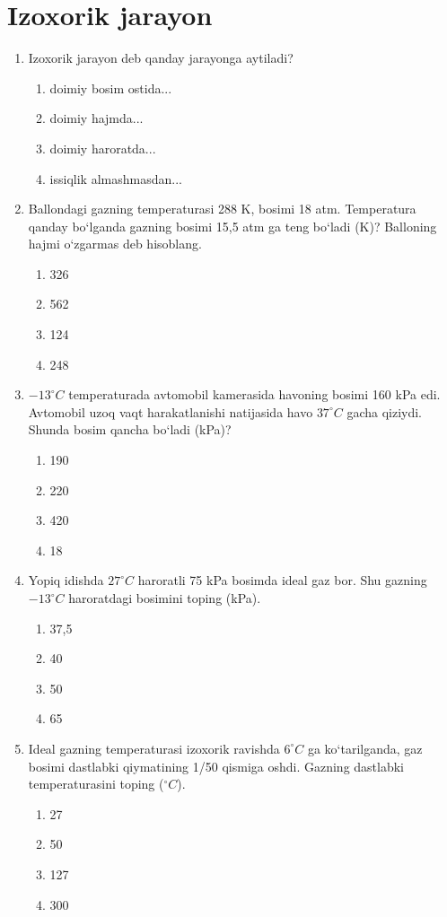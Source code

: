 \section{Izoxorik jarayon}


\begin{enumerate}

\item Izoxorik jarayon deb qanday jarayonga aytiladi?
\begin{enumerate}[label=\Alph*)]
\item doimiy bosim ostida...
\item doimiy hajmda...
\item doimiy haroratda...
\item issiqlik almashmasdan...
\end{enumerate}

\item Ballondagi gazning temperaturasi 288 K, bosimi 18 atm. Temperatura qanday bo‘lganda gazning bosimi 15,5 atm ga teng bo‘ladi (K)? Balloning hajmi o‘zgarmas deb hisoblang.
\begin{enumerate}[label=\Alph*)]
\item 326
\item 562
\item 124
\item 248
\end{enumerate}

\item $-13^\circ C$ temperaturada avtomobil kamerasida havoning bosimi 160 kPa edi. Avtomobil uzoq vaqt harakatlanishi natijasida havo $37^\circ C$ gacha qiziydi. Shunda bosim qancha bo‘ladi (kPa)?
\begin{enumerate}[label=\Alph*)]
\item 190
\item 220
\item 420
\item 18
\end{enumerate}

\item Yopiq idishda $27^\circ C$ haroratli 75 kPa bosimda ideal gaz bor. Shu gazning $-13^\circ C$ haroratdagi bosimini toping (kPa).
\begin{enumerate}[label=\Alph*)]
\item 37,5
\item 40
\item 50
\item 65
\end{enumerate}

\item Ideal gazning temperaturasi izoxorik ravishda $6^\circ C$ ga ko‘tarilganda, gaz bosimi dastlabki qiymatining 1/50 qismiga oshdi. Gazning dastlabki temperaturasini toping ($^\circ C$).
\begin{enumerate}[label=\Alph*)]
\item 27
\item 50
\item 127
\item 300
\end{enumerate}


\end{enumerate}
